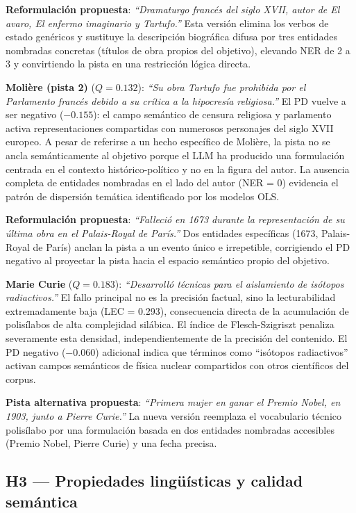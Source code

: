 \documentclass[../main.tex]{subfiles}
\begin{document}
\textbf{Reformulación propuesta}: \textit{``Dramaturgo francés del siglo XVII, autor de \textit{El avaro}, \textit{El enfermo imaginario} y \textit{Tartufo}.''} Esta versión elimina los verbos de estado genéricos y sustituye la descripción biográfica difusa por tres entidades nombradas concretas (títulos de obra propios del objetivo), elevando NER de 2 a 3 y convirtiendo la pista en una restricción lógica directa.

\textbf{Molière (pista 2)} ($Q = 0.132$): \textit{``Su obra \textit{Tartufo} fue prohibida por el Parlamento francés debido a su crítica a la hipocresía religiosa.''} El PD vuelve a ser negativo ($-0.155$): el campo semántico de censura religiosa y parlamento activa representaciones compartidas con numerosos personajes del siglo XVII europeo. A pesar de referirse a un hecho específico de Molière, la pista no se ancla semánticamente al objetivo porque el LLM ha producido una formulación centrada en el contexto histórico-político y no en la figura del autor. La ausencia completa de entidades nombradas en el lado del autor (NER = 0) evidencia el patrón de dispersión temática identificado por los modelos OLS.

\textbf{Reformulación propuesta}: \textit{``Falleció en 1673 durante la representación de su última obra en el Palais-Royal de París.''} Dos entidades específicas (1673, Palais-Royal de París) anclan la pista a un evento único e irrepetible, corrigiendo el PD negativo al proyectar la pista hacia el espacio semántico propio del objetivo.

\textbf{Marie Curie} ($Q = 0.183$): \textit{``Desarrolló técnicas para el aislamiento de isótopos radiactivos.''} El fallo principal no es la precisión factual, sino la lecturabilidad extremadamente baja (LEC = 0.293), consecuencia directa de la acumulación de polisílabos de alta complejidad silábica. El índice de Flesch-Szigriszt penaliza severamente esta densidad, independientemente de la precisión del contenido. El PD negativo ($-0.060$) adicional indica que términos como ``isótopos radiactivos'' activan campos semánticos de física nuclear compartidos con otros científicos del corpus.

\textbf{Pista alternativa propuesta}: \textit{``Primera mujer en ganar el Premio Nobel, en 1903, junto a Pierre Curie.''} La nueva versión reemplaza el vocabulario técnico polisílabo por una formulación basada en dos entidades nombradas accesibles (Premio Nobel, Pierre Curie) y una fecha precisa.

\subsection{H3 --- Propiedades lingüísticas y calidad semántica}
\end{document}
